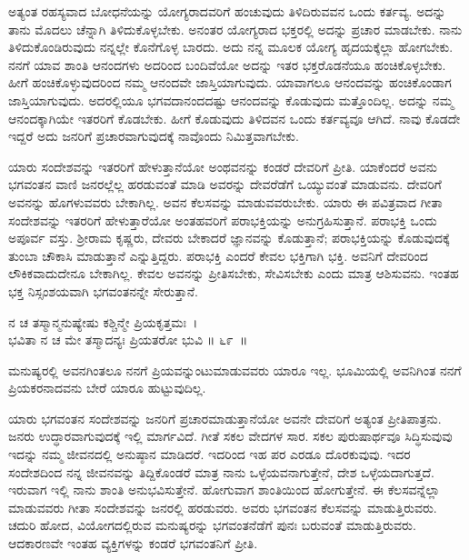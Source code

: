 ಅತ್ಯಂತ ರಹಸ್ಯವಾದ ಬೋಧನೆಯನ್ನು ಯೋಗ್ಯರಾದವರಿಗೆ ಹಂಚುವುದು ತಿಳಿದಿರುವವನ ಒಂದು ಕರ್ತವ್ಯ. ಅದನ್ನು ತಾನು ಮೊದಲು ಚೆನ್ನಾಗಿ ತಿಳಿದುಕೊಳ್ಳಬೇಕು. ಅನಂತರ ಯೋಗ್ಯರಾದ ಭಕ್ತರಲ್ಲಿ ಅದನ್ನು ಪ್ರಚಾರ ಮಾಡಬೇಕು. ನಾನು ತಿಳಿದುಕೊಂಡಿರುವುದು ನನ್ನಲ್ಲೇ ಕೊನೆಗೊಳ್ಳ ಬಾರದು. ಅದು ನನ್ನ ಮೂಲಕ ಯೋಗ್ಯ ಹೃದಯಕ್ಕೆಲ್ಲಾ ಹೋಗಬೇಕು. ನನಗೆ ಯಾವ ಶಾಂತಿ ಆನಂದಗಳು ಅದರಿಂದ ಬಂದಿವೆಯೋ ಅದನ್ನು ಇತರ ಭಕ್ತರೊಡನೆಯೂ ಹಂಚಿ\-ಕೊಳ್ಳಬೇಕು. ಹೀಗೆ ಹಂಚಿಕೊಳ್ಳುವುದರಿಂದ ನಮ್ಮ ಆನಂದವೇ ಜಾಸ್ತಿಯಾಗುವುದು. ಯಾವಾ\-ಗಲೂ ಆನಂದವನ್ನು ಹಂಚಿಕೊಂಡಾಗ ಜಾಸ್ತಿಯಾಗುವುದು. ಅದರಲ್ಲಿಯೂ ಭಗವದಾನಂದದಷ್ಟು ಆನಂದವನ್ನು ಕೊಡುವುದು ಮತ್ತೊಂದಿಲ್ಲ. ಅದನ್ನು ನಮ್ಮ ಆನಂದಕ್ಕಾಗಿಯೇ ಇತರರಿಗೆ ಕೊಡಬೇಕು. ಹೀಗೆ ಕೊಡುವುದು ತಿಳಿದವನ ಒಂದು ಕರ್ತವ್ಯವೂ ಆಗಿದೆ. ನಾವು ಕೊಡದೇ ಇದ್ದರೆ ಅದು ಜನರಿಗೆ ಪ್ರಚಾರವಾಗುವುದಕ್ಕೆ ನಾವೊಂದು ನಿಮಿತ್ತವಾಗಬೇಕು.

ಯಾರು ಸಂದೇಶವನ್ನು ಇತರರಿಗೆ ಹೇಳುತ್ತಾನೆಯೋ ಅಂಥವನನ್ನು ಕಂಡರೆ ದೇವರಿಗೆ ಪ್ರೀತಿ. ಯಾಕೆಂದರೆ ಅವನು ಭಗವಂತನ ವಾಣಿ ಜನರಲ್ಲೆಲ್ಲ ಹರಡುವಂತೆ ಮಾಡಿ ಅವರನ್ನು ದೇವರೆಡೆಗೆ ಒಯ್ಯುವಂತೆ ಮಾಡುವನು. ದೇವರಿಗೆ ಅವನನ್ನು ಹೊಗಳುವವರು ಬೇಕಾಗಿಲ್ಲ. ಅವನ ಕೆಲಸವನ್ನು ಮಾಡುವವರುಬೇಕು. ಯಾರು ಈ ಪವಿತ್ರವಾದ ಗೀತಾ ಸಂದೇಶವನ್ನು ಇತರರಿಗೆ ಹೇಳುತ್ತಾರೆಯೋ ಅಂತಹವರಿಗೆ ಪರಾಭಕ್ತಿಯನ್ನು ಅನುಗ್ರಹಿಸುತ್ತಾನೆ. ಪರಾಭಕ್ತಿ ಒಂದು ಅಪೂರ್ವ ವಸ್ತು. ಶ‍್ರೀರಾಮ ಕೃಷ್ಣರು, ದೇವರು ಬೇಕಾದರೆ ಜ್ಞಾನವನ್ನು ಕೊಡುತ್ತಾನೆ; ಪರಾಭಕ್ತಿಯನ್ನು ಕೊಡುವುದಕ್ಕೆ ತುಂಬಾ ಚೌಕಾಸಿ ಮಾಡುತ್ತಾನೆ ಎನ್ನುತ್ತಿದ್ದರು. ಪರಾಭಕ್ತಿ ಎಂದರೆ ಕೇವಲ ಭಕ್ತಿಗಾಗಿ ಭಕ್ತಿ. ಅವನಿಗೆ ದೇವರಿಂದ ಲೌಕಿಕವಾದುದೇನೂ ಬೇಕಾಗಿಲ್ಲ. ಕೇವಲ ಅವನನ್ನು ಪ್ರೀತಿಸಬೇಕು, ಸೇವಿಸಬೇಕು ಎಂದು ಮಾತ್ರ ಆಶಿಸುವನು. ಇಂತಹ ಭಕ್ತ ನಿಸ್ಸಂಶಯವಾಗಿ ಭಗವಂತನನ್ನೇ ಸೇರುತ್ತಾನೆ.

\begin{shloka}
ನ ಚ ತಸ್ಮಾನ್ಮನುಷ್ಯೇಷು ಕಶ್ಚಿನ್ಮೇ ಪ್ರಿಯಕೃತ್ತಮಃ~।\\ಭವಿತಾ ನ ಚ ಮೇ ತಸ್ಮಾದನ್ಯಃ ಪ್ರಿಯತರೋ ಭುವಿ \hfill॥ ೬೯~॥
\end{shloka}

\begin{artha}
ಮನುಷ್ಯರಲ್ಲಿ ಅವನಗಿಂತಲೂ ನನಗೆ ಪ್ರಿಯವನ್ನುಂಟುಮಾಡುವವರು ಯಾರೂ ಇಲ್ಲ. ಭೂಮಿಯಲ್ಲಿ ಅವನಿಗಿಂತ ನನಗೆ ಪ್ರಿಯಕರನಾದವನು ಬೇರೆ ಯಾರೂ ಹುಟ್ಟುವುದಿಲ್ಲ.
\end{artha}

ಯಾರು ಭಗವಂತನ ಸಂದೇಶವನ್ನು ಜನರಿಗೆ ಪ್ರಚಾರಮಾಡುತ್ತಾನೆಯೋ ಅವನೇ ದೇವರಿಗೆ ಅತ್ಯಂತ ಪ್ರೀತಿಪಾತ್ರನು. ಜನರು ಉದ್ಧಾರವಾಗುವುದಕ್ಕೆ ಇಲ್ಲಿ ಮಾರ್ಗವಿದೆ. ಗೀತೆ ಸಕಲ ವೇದಗಳ ಸಾರ. ಸಕಲ ಪುರುಷಾರ್ಥವೂ ಸಿದ್ಧಿಸುವುವು ಇದನ್ನು ನಮ್ಮ ಜೀವನದಲ್ಲಿ ಅನುಷ್ಠಾನ ಮಾಡಿದರೆ. ಇದರಿಂದ ಇಹ ಪರ ಎರಡೂ ದೊರಕುವುವು. ಇದರ ಸಂದೇಶದಿಂದ ನನ್ನ ಜೀವನವನ್ನು ತಿದ್ದಿಕೊಂಡರೆ ಮಾತ್ರ ನಾನು ಒಳ್ಳೆಯವನಾಗುತ್ತೇನೆ, ದೇಶ ಒಳ್ಳೆಯದಾಗುತ್ತದೆ. ಇರುವಾಗ ಇಲ್ಲಿ ನಾನು ಶಾಂತಿ ಅನುಭವಿಸುತ್ತೇನೆ. ಹೋಗುವಾಗ ಶಾಂತಿಯಿಂದ ಹೋಗುತ್ತೇನೆ. ಈ ಕೆಲಸವನ್ನೆಲ್ಲಾ ಮಾಡುವವರು ಗೀತಾ ಸಂದೇಶವನ್ನು ಜನರಲ್ಲಿ ಹರಡುವರು. ಅವರು ಭಗವಂತನ ಕೆಲಸವನ್ನು ಮಾಡುತ್ತಿರುವರು. ಚದುರಿ ಹೋದ, ವಿಯೋಗದಲ್ಲಿರುವ ಮನುಷ್ಯರನ್ನು ಭಗವಂತನೆಡೆಗೆ ಪುನಃ ಬರುವಂತೆ ಮಾಡುತ್ತಿರುವರು. ಆದಕಾರಣವೇ ಇಂತಹ ವ್ಯಕ್ತಿಗಳನ್ನು ಕಂಡರೆ ಭಗವಂತನಿಗೆ ಪ್ರೀತಿ.

